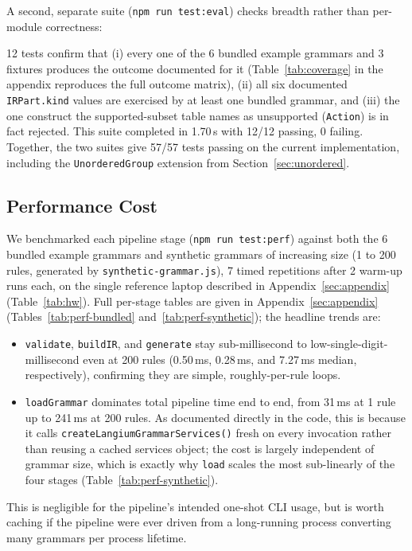 \documentclass[runningheads]{llncs}
\begin{document}
A second, separate suite (\texttt{npm run test:eval}) checks breadth rather than per-module correctness: {12 tests confirm that (i) every one of the 6 bundled example grammars and 3 fixtures produces the outcome documented for it (Table~\ref{tab:coverage} in the appendix reproduces the full outcome matrix), (ii) all six documented \texttt{IRPart.kind} values are exercised by at least one bundled grammar, and (iii) the one construct the supported-subset table names as unsupported (\texttt{Action}) is in fact rejected. This suite completed in 1.70\,s with 12/12 passing, 0 failing. Together, the two suites give 57/57 tests passing on the current implementation, including the \texttt{UnorderedGroup} extension from Section~\ref{sec:unordered}.

\subsection{Performance Cost}
We benchmarked each pipeline stage (\texttt{npm run test:perf}) against both the 6 bundled example grammars and synthetic grammars of increasing size (1 to 200 rules, generated by \texttt{synthetic-grammar.js}), 7 timed repetitions after 2 warm-up runs each, on the single reference laptop described in Appendix~\ref{sec:appendix} (Table~\ref{tab:hw}). Full per-stage tables are given in Appendix~\ref{sec:appendix} (Tables~\ref{tab:perf-bundled} and~\ref{tab:perf-synthetic}); the headline trends are:

\begin{itemize}
\item \texttt{validate}, \texttt{buildIR}, and \texttt{generate} stay sub-millisecond to low-single-digit-millisecond even at 200 rules (0.50\,ms, 0.28\,ms, and 7.27\,ms median, respectively), confirming they are simple, roughly-per-rule loops.
\item \texttt{loadGrammar} dominates total pipeline time end to end, from 31\,ms at 1 rule up to 241\,ms at 200 rules. As documented directly in the code, this is because it calls \texttt{createLangiumGrammarServices()} fresh on every invocation rather than reusing a cached services object; the cost is largely independent of grammar size, which is exactly why \texttt{load} scales the most sub-linearly of the four stages (Table~\ref{tab:perf-synthetic}).
\end{itemize}

This is negligible for the pipeline's intended one-shot CLI usage, but is worth caching if the pipeline were ever driven from a long-running process converting many grammars per process lifetime.

}
\end{document}

